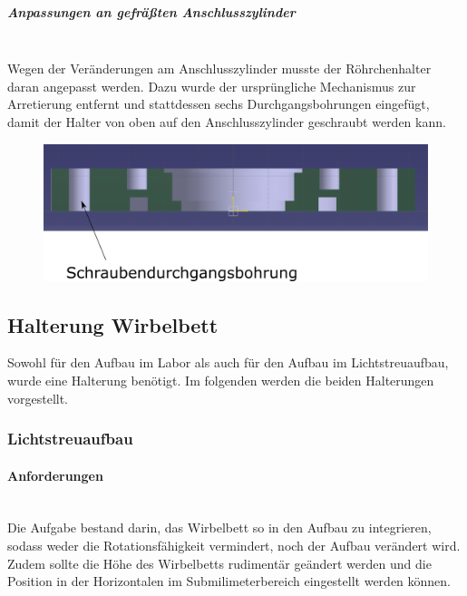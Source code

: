 \subparagraph{Anpassungen an gefräßten Anschlusszylinder}
\hfill \\

Wegen der Veränderungen am Anschlusszylinder musste der Röhrchenhalter daran angepasst werden. Dazu  wurde der ursprüngliche Mechanismus zur Arretierung entfernt und stattdessen sechs Durchgangsbohrungen eingefügt, damit der Halter von oben auf den Anschlusszylinder geschraubt werden kann.

\begin{figure}[h!]
	\begin{center}
		\includegraphics[scale=0.6]{Schnitt_RoehrchenhalterV2.png}
		\caption[Röhrchenhalter V2]{}
	\end{center}
\end{figure}


\subsection{Halterung Wirbelbett}

Sowohl für den Aufbau im Labor als auch für den Aufbau im Lichtstreuaufbau, wurde eine Halterung benötigt. Im folgenden werden die beiden Halterungen vorgestellt.

\subsubsection{Lichtstreuaufbau}


\paragraph{Anforderungen}

\hfill \\
Die Aufgabe bestand darin, das Wirbelbett so in den Aufbau zu integrieren, sodass weder die Rotationsfähigkeit vermindert, noch der Aufbau verändert wird. Zudem sollte die Höhe des Wirbelbetts rudimentär geändert werden und die Position in der Horizontalen im Submilimeterbereich eingestellt werden können. 


